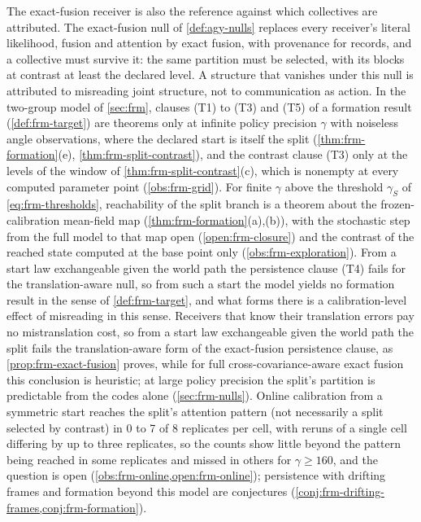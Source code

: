 The exact-fusion receiver is also the reference against which collectives are attributed. The exact-fusion null of \cref{def:agy-nulls} replaces every receiver's literal likelihood, fusion and attention by exact fusion, with provenance for records, and a collective must survive it: the same partition must be selected, with its blocks at contrast at least the declared level. A structure that vanishes under this null is attributed to misreading joint structure, not to communication as action. In the two-group model of \cref{sec:frm}, clauses (T1) to (T3) and (T5) of a formation result (\cref{def:frm-target}) are theorems only at infinite policy precision $\gamma$ with noiseless angle observations, where the declared start is itself the split (\cref{thm:frm-formation}(e), \cref{thm:frm-split-contrast}), and the contrast clause (T3) only at the levels of the window of \cref{thm:frm-split-contrast}(c), which is nonempty at every computed parameter point (\cref{obs:frm-grid}). For finite $\gamma$ above the threshold $\gamma_S$ of \eqref{eq:frm-thresholds}, reachability of the split branch is a theorem about the frozen-calibration mean-field map (\cref{thm:frm-formation}(a),(b)), with the stochastic step from the full model to that map open (\cref{open:frm-closure}) and the contrast of the reached state computed at the base point only (\cref{obs:frm-exploration}). From a start law exchangeable given the world path the persistence clause (T4) fails for the translation-aware null, so from such a start the model yields no formation result in the sense of \cref{def:frm-target}, and what forms there is a calibration-level effect of misreading in this sense. Receivers that know their translation errors pay no mistranslation cost, so from a start law exchangeable given the world path the split fails the translation-aware form of the exact-fusion persistence clause, as \cref{prop:frm-exact-fusion} proves, while for full cross-covariance-aware exact fusion this conclusion is heuristic; at large policy precision the split's partition is predictable from the codes alone (\cref{sec:frm-nulls}). Online calibration from a symmetric start reaches the split's attention pattern (not necessarily a split selected by contrast) in 0 to 7 of 8 replicates per cell, with reruns of a single cell differing by up to three replicates, so the counts show little beyond the pattern being reached in some replicates and missed in others for $\gamma\ge160$, and the question is open (\cref{obs:frm-online,open:frm-online}); persistence with drifting frames and formation beyond this model are conjectures (\cref{conj:frm-drifting-frames,conj:frm-formation}).


